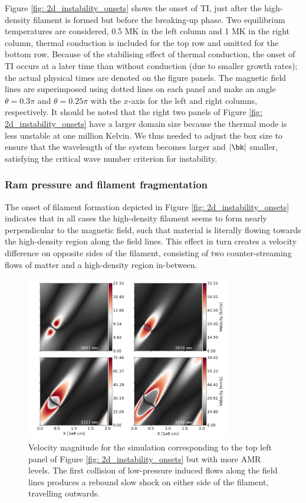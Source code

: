 Figure \ref{fig: 2d_instability_onsets} shows the onset of TI, just after the high-density filament is formed but before the breaking-up phase. Two equilibrium temperatures are considered, 0.5 MK in the left column and 1 MK in the right column, thermal conduction is included for the top row and omitted for the bottom row. Because of the stabilising effect of thermal conduction, the onset of TI occurs at a later time than without conduction (due to smaller growth rates); the actual physical times are denoted on the figure panels. The magnetic field lines are superimposed using dotted lines on each panel and make an angle $\theta = 0.3\pi$ and $\theta = 0.25\pi$ with the $x$-axis for the left and right columns, respectively. It should be noted that the right two panels of Figure \ref{fig: 2d_instability_onsets} have a larger domain size because the thermal mode is less unstable at one million Kelvin. We thus needed to adjust the box size to ensure that the wavelength of the system becomes larger and $|\bk|$ smaller, satisfying the critical wave number criterion for instability.

\subsubsection{Ram pressure and filament fragmentation}
The onset of filament formation depicted in Figure \ref{fig: 2d_instability_onsets} indicates that in all cases the high-density filament seems to form nearly perpendicular to the magnetic field, such that material is literally flowing towards the high-density region along the field lines. This effect in turn creates a velocity difference on opposite sides of the filament, consisting of two counter-streaming flows of matter and a high-density region in-between.

\begin{figure}[t]
  \centering
  \includegraphics[width=0.8\textwidth]{2d_velocity_plots.png}
  \caption{
    Velocity magnitude for the simulation corresponding to the top left panel of Figure \ref{fig: 2d_instability_onsets} but with more AMR levels. The first collision of low-pressure induced flows along the field lines produces a rebound slow shock on either side of the filament, travelling outwards.
  }
  \label{fig: 2d_velocity_plots}
\end{figure}

